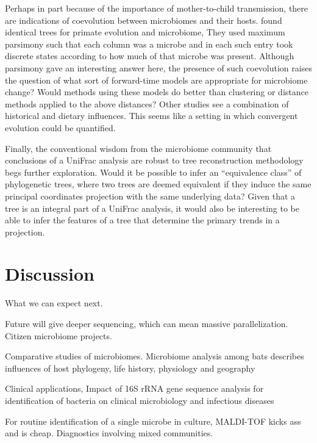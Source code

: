 \documentclass{amsart}
\begin{document}
Perhaps in part because of the importance of mother-to-child transmission, there are indications of coevolution between microbiomes and their hosts.
\citet{ochman2010evolutionary} found identical trees for primate evolution and microbiome,
They used maximum parsimony such that each column was a microbe and in each such entry took discrete states according to how much of that microbe was present.
Although parsimony gave an interesting answer here, the presence of such coevolution raises the question of what sort of forward-time models are appropriate for microbiome change?
Would methods using these models do better than clustering or distance methods applied to the above distances?
Other studies \citep[e.g.][]{phillips2012microbiome,delsuc2013convergence} see a combination of historical and dietary influences.
This seems like a setting in which convergent evolution could be quantified.

Finally, the conventional wisdom from the microbiome community that conclusions of a UniFrac analysis are robust to tree reconstruction methodology begs further exploration.
Would it be possible to infer an ``equivalence class'' of phylogenetic trees, where two trees are deemed equivalent if they induce the same principal coordinates projection with the same underlying data?
Given that a tree is an integral part of a UniFrac analysis, it would also be interesting to be able to infer the features of a tree that determine the primary trends in a projection.


\section{Discussion}
What we can expect next.

Future will give deeper sequencing, which can mean massive parallelization.
Citizen microbiome projects.


Comparative studies of microbiomes.
Microbiome analysis among bats describes influences of host phylogeny, life history, physiology and geography

Clinical applications,
\citep{clarridge2004}
{{I}mpact of 16{S} r{RNA} gene sequence analysis for identification of bacteria on clinical microbiology and infectious diseases}

For routine identification of a single microbe in culture, MALDI-TOF kicks ass and is cheap.
Diagnostics involving mixed communities.
\end{document}
